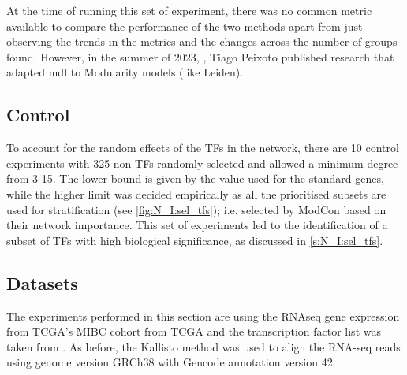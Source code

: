 At the time of running this set of experiment, there was no common metric available to compare the performance of the two methods apart from just observing the trends in the metrics and the changes across the number of groups found. However, in the summer of 2023, \cite{Peixoto2023-mw}, Tiago Peixoto published research that adapted \acrshort{mdl} to Modularity models (like Leiden).

\subsection*{Control}

To account for the random effects of the TFs in the network, there are 10 control experiments with 325 non-TFs randomly selected and allowed a minimum degree from 3-15. The lower bound is given by the value used for the standard genes, while the higher limit was decided empirically as all the prioritised subsets are used for stratification (see \cref{fig:N_I:sel_tfs}); i.e. selected by ModCon based on their network importance. This set of experiments led to the identification of a subset of TFs with high biological significance, as discussed in \cref{s:N_I:sel_tfs}.



\subsection* {Datasets}

The experiments performed in this section are using the RNAseq gene expression from TCGA's MIBC cohort from TCGA and the transcription factor list was taken from \citet{Lambert2018-el}. As before, the Kallisto method was used to align the RNA-seq reads using genome version GRCh38 with Gencode annotation version 42. 
